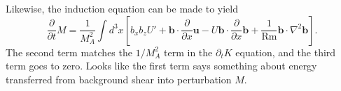 \documentclass[aps,pop,preprint]{revtex4}
\begin{document}
Likewise, the induction equation can be made to yield
\begin{equation}
    \frac{\partial}{\partial t} M = \frac{1}{M_A^2}\int d^3x \left[ b_x b_z U' + \mathbf{b} \cdot \frac{\partial}{\partial x} \mathbf{u} - U \mathbf{b} \cdot \frac{\partial}{\partial x} \mathbf{b} + \frac{1}{\mathrm{Rm}} \mathbf{b} \cdot \nabla^2 \mathbf{b} \right].
\end{equation}
The second term matches the $1/M_A^2$ term in the $\partial_t K$ equation, and the third term goes to zero. Looks like the first term says something about energy transferred from background shear into perturbation $M$.
\end{document}
